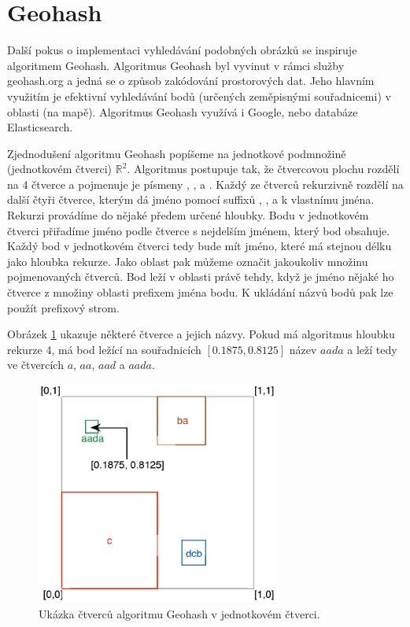 \section{Geohash}
Další pokus o implementaci vyhledávání podobných obrázků se inspiruje algoritmem Geohash\cite{geohash}. Algoritmus Geohash byl vyvinut v rámci služby geohash.org a jedná se o způsob zakódování prostorových dat. Jeho hlavním využitím je efektivní vyhledávání bodů (určených zeměpisnými souřadnicemi) v oblasti (na mapě). Algoritmus Geohash využívá i Google, nebo databáze Elasticsearch.

Zjednodušení algoritmu Geohash popíšeme na jednotkové podmnožině (jednotkovém čtverci) $\mathbb{R}^2$. Algoritmus postupuje tak, že čtvercovou plochu rozdělí na 4 čtverce a pojmenuje je písmeny , ,  a . Každý ze čtverců rekurzivně rozdělí na další čtyři čtverce, kterým dá jméno pomocí suffixů , ,  a  k vlastnímu jména. Rekurzi provádíme do nějaké předem určené hloubky. Bodu v jednotkovém čtverci přiřadíme jméno podle čtverce s nejdelším jménem, který bod obsahuje. Každý bod v jednotkovém čtverci tedy bude mít jméno, které má stejnou délku jako hloubka rekurze. Jako oblast pak můžeme označit jakoukoliv množinu pojmenovaných čtverců. Bod leží v oblasti právě tehdy, když je jméno nějaké ho čtverce z množiny oblasti prefixem jména bodu. K ukládání názvů bodů pak lze použít prefixový strom.

Obrázek \ref{fig:geohash} ukazuje některé čtverce a jejich názvy. Pokud má algoritmus hloubku rekurze 4, má bod ležící na souřadnicích $[0.1875, 0.8125]$ název $aada$ a leží tedy ve čtvercích $a$, $aa$, $aad$ a $aada$.


\begin{figure}[h]
  \centering
  \includegraphics[width=80mm]{geohash.eps}
  \caption{Ukázka čtverců algoritmu Geohash v jednotkovém čtverci.}
  \label{fig:geohash}
\end{figure}

